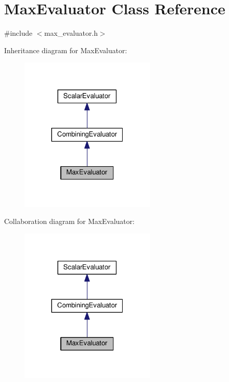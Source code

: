 \hypertarget{classMaxEvaluator}{\section{Max\-Evaluator Class Reference}
\label{classMaxEvaluator}
}


{\ttfamily \#include $<$max\-\_\-evaluator.\-h$>$}



Inheritance diagram for Max\-Evaluator\-:
\nopagebreak
\begin{figure}[H]
\begin{center}
\leavevmode
\includegraphics[width=184pt]{classMaxEvaluator__inherit__graph}
\end{center}
\end{figure}


Collaboration diagram for Max\-Evaluator\-:
\nopagebreak
\begin{figure}[H]
\begin{center}
\leavevmode
\includegraphics[width=184pt]{classMaxEvaluator__coll__graph}
\end{center}
\end{figure}
